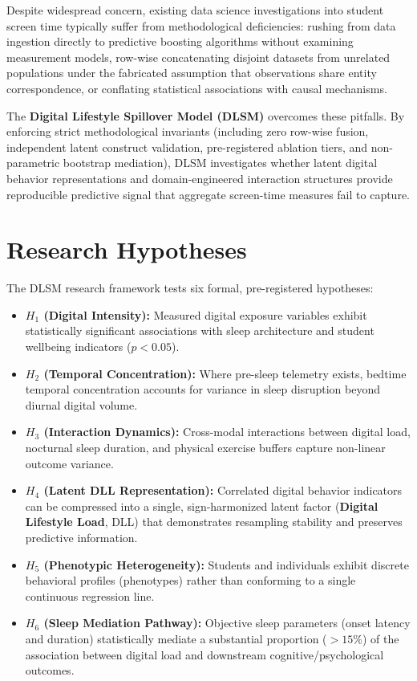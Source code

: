 \documentclass[10pt,twocolumn,a4paper]{article}
\begin{document}
Despite widespread concern, existing data science investigations into student screen time typically suffer from methodological deficiencies: rushing from data ingestion directly to predictive boosting algorithms without examining measurement models, row-wise concatenating disjoint datasets from unrelated populations under the fabricated assumption that observations share entity correspondence, or conflating statistical associations with causal mechanisms.

The \textbf{Digital Lifestyle Spillover Model (DLSM)} overcomes these pitfalls. By enforcing strict methodological invariants (including zero row-wise fusion, independent latent construct validation, pre-registered ablation tiers, and non-parametric bootstrap mediation), DLSM investigates whether latent digital behavior representations and domain-engineered interaction structures provide reproducible predictive signal that aggregate screen-time measures fail to capture.

\section{Research Hypotheses}
The DLSM research framework tests six formal, pre-registered hypotheses:
\begin{itemize}
    \item \textbf{$H_1$ (Digital Intensity):} Measured digital exposure variables exhibit statistically significant associations with sleep architecture and student wellbeing indicators ($p < 0.05$).
    \item \textbf{$H_2$ (Temporal Concentration):} Where pre-sleep telemetry exists, bedtime temporal concentration accounts for variance in sleep disruption beyond diurnal digital volume.
    \item \textbf{$H_3$ (Interaction Dynamics):} Cross-modal interactions between digital load, nocturnal sleep duration, and physical exercise buffers capture non-linear outcome variance.
    \item \textbf{$H_4$ (Latent DLL Representation):} Correlated digital behavior indicators can be compressed into a single, sign-harmonized latent factor (\textbf{Digital Lifestyle Load}, DLL) that demonstrates resampling stability and preserves predictive information.
    \item \textbf{$H_5$ (Phenotypic Heterogeneity):} Students and individuals exhibit discrete behavioral profiles (phenotypes) rather than conforming to a single continuous regression line.
    \item \textbf{$H_6$ (Sleep Mediation Pathway):} Objective sleep parameters (onset latency and duration) statistically mediate a substantial proportion ($>15\%$) of the association between digital load and downstream cognitive/psychological outcomes.
\end{itemize}
\end{document}

